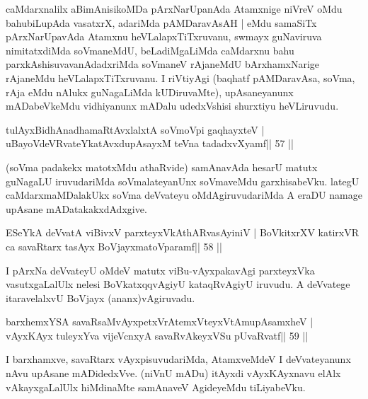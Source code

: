 \begin{artha}
caMdarxnalilx aBimAnisikoMDa pArxNarUpanAda Atamxnige niVreV oMdu  bahubiLupAda vasatxrX, adariMda pAMDaravAsAH | eMdu samaSiTx  pArxNarUpavAda Atamxnu heVLalapxTiTxruvanu, swmayx guNaviruva  nimitatxdiMda soVmaneMdU, beLadiMgaLiMda caMdarxnu bahu  parxkAshisuvavanAdadxriMda soVmaneV rAjaneMdU bArxhamxNarige rAjaneMdu heVLalapxTiTxruvanu. I riVtiyAgi (baqhatf pAMDaravAsa, soVma, rAja eMdu nAlukx guNagaLiMda kUDiruvaMte), upAsaneyanunx mADabeVkeMdu vidhiyanunx mADalu udedxVshisi shurxtiyu heVLiruvudu.
\end{artha}

\begin{shl}
tulAyxBidhAnadhamaRtAvxlalxtA soVmoV\s pi gaqhayxteV |
uBayoVdeVRvateYkatAvxdupAsayxM teVna tadadxvXyamf\hfill || 57 ||
\end{shl}

\begin{artha}
(soVma padakekx matotxMdu athaRvide) samAnavAda hesarU matutx guNagaLU  iruvudariMda soVmalateyanUnx soVmaveMdu garxhisabeVku. lategU  caMdarxmaMDalakUkx soVma deVvateyu oMdAgiruvudariMda A eraDU namage upAsane mADatakakxdAdxgive.
\end{artha}

\begin{shl}
ESeYkA deVvatA viBivxV parxteyxVkAthARvasAyiniV |
BoVkitxrXV katirxVR ca savaRtarx tasAyx BoVjayxmatoV\s paramf\hfill || 58 ||
\end{shl}

\begin{artha}
I pArxNa deVvateyU oMdeV matutx viBu-vAyxpakavAgi parxteyxVka  vasutxgaLalUlx nelesi BoVkatxqqvAgiyU kataqRvAgiyU iruvudu. A deVvatege itaravelalxvU BoVjayx (ananx)vAgiruvadu.
\end{artha}

\begin{shl}
barxhemxYSA savaRsaMvAyxpetxVrAtemxVteyxVtAmupAsamxheV |
vAyxKAyx tuleyxYva vijeVcnxyA savaRvAkeyxVSu pUvaRvatf\hfill || 59 ||
\end{shl}

\begin{artha}
I barxhamxve, savaRtarx vAyxpisuvudariMda, AtamxveMdeV I deVvateyanunx nAvu upAsane mADidedxVve. (niVnU mADu) itAyxdi vAyxKAyxnavu elAlx vAkayxgaLalUlx hiMdinaMte samAnaveV AgideyeMdu tiLiyabeVku.
\end{artha}


